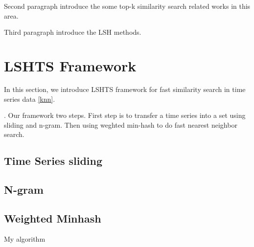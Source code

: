\documentclass{article}
\makeatletter
\def\BState{\State\hskip-\ALG@thistlm}
\makeatother
\begin{document}
Second paragraph introduce the some top-k similarity search related works in this area.

Third paragraph introduce the LSH methods.


\section{LSHTS Framework}

In this section, we introduce LSHTS framework for fast similarity search in time series data \ref{knn}. 


. Our framework two steps. First step is to transfer a time series into a set using sliding and n-gram.
Then using weghted min-hash to do fast nearest neighbor search.

\subsection {Time Series sliding}

\subsection {N-gram}

\subsection {Weighted Minhash}

\begin{algorithm}
\caption{My algorithm}\label{euclid}
\end{algorithm}

%			
\end{document}

